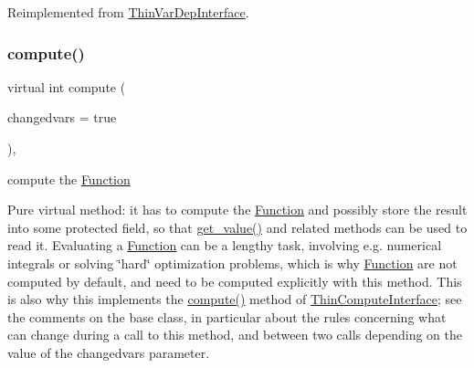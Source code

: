 Reimplemented from \mbox{\hyperlink{group___thin_var_dep_interface___c_l_a_s_s_e_s_gae16067de85b435fac4ce8558b193a99a}{Thin\+Var\+Dep\+Interface}}.

\mbox{\label{class_s_m_spp__di__unipi__it_1_1_linear_function_afc8ff54ab05d22f4cca0fb0bfbeb7a49}} 
\subsubsection{\texorpdfstring{compute()}{compute()}}
{\footnotesize\ttfamily virtual int compute (\begin{DoxyParamCaption}\item[{bool}]{changedvars = {\ttfamily true} }\end{DoxyParamCaption})\hspace{0.3cm}{\ttfamily [override]}, {\ttfamily [virtual]}}



compute the \mbox{\hyperlink{class_s_m_spp__di__unipi__it_1_1_function}{Function}} 

Pure virtual method\+: it has to compute the \mbox{\hyperlink{class_s_m_spp__di__unipi__it_1_1_function}{Function}} and possibly store the result into some protected field, so that \mbox{\hyperlink{class_s_m_spp__di__unipi__it_1_1_linear_function_ae74d8c7f3dc6100820de31198c77ca25}{get\+\_\+value()}} and related methods can be used to read it. Evaluating a \mbox{\hyperlink{class_s_m_spp__di__unipi__it_1_1_function}{Function}} can be a lengthy task, involving e.\+g. numerical integrals or solving \char`\"{}hard\char`\"{} optimization problems, which is why \mbox{\hyperlink{class_s_m_spp__di__unipi__it_1_1_function}{Function}} are not computed by default, and need to be computed explicitly with this method. This is also why this implements the \mbox{\hyperlink{class_s_m_spp__di__unipi__it_1_1_linear_function_afc8ff54ab05d22f4cca0fb0bfbeb7a49}{compute()}} method of \mbox{\hyperlink{class_s_m_spp__di__unipi__it_1_1_thin_compute_interface}{Thin\+Compute\+Interface}}; see the comments on the base class, in particular about the rules concerning what can change during a call to this method, and between two calls depending on the value of the changedvars parameter.

